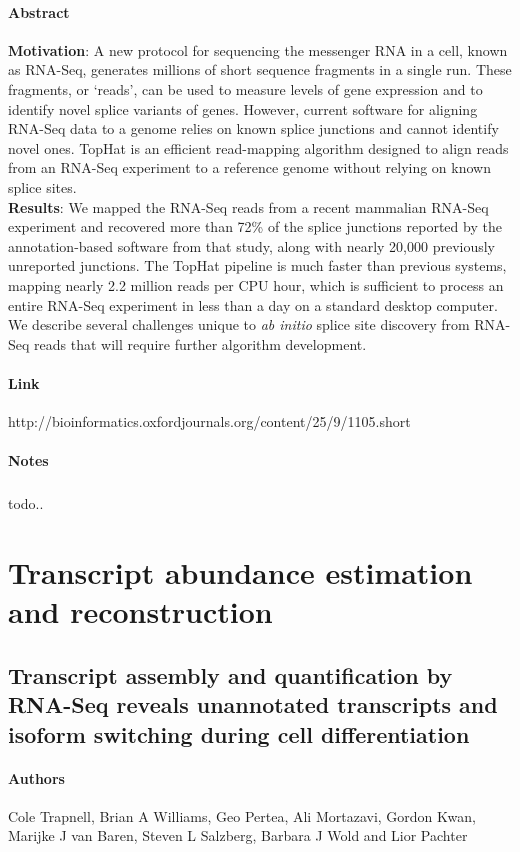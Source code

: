 \documentclass{article}
\begin{document}
			\paragraph{Abstract\\} \textbf{Motivation}: A new protocol for sequencing the messenger RNA in a cell, known as RNA-Seq, generates millions of short sequence fragments in a single run. These fragments, or ‘reads’, can be used to measure levels of gene expression and to identify novel splice variants of genes. However, current software for aligning RNA-Seq data to a genome relies on known splice junctions and cannot identify	novel ones. TopHat is an efficient read-mapping algorithm designed to align reads from an RNA-Seq experiment to a reference genome without relying on known splice sites.\\
			\textbf{Results}: We mapped the RNA-Seq reads from a recent mammalian
			RNA-Seq experiment and recovered more than 72\% of the splice junctions reported by the annotation-based software from that study, along with nearly 20,000 previously unreported junctions. The TopHat pipeline is much faster than previous systems, mapping nearly 2.2 million reads per CPU hour, which is sufficient to process an entire RNA-Seq experiment in less than a day on a standard desktop computer. We describe several challenges unique to \textit{ab initio} splice site discovery from RNA-Seq reads that will require further algorithm development.
			\paragraph{Link\\} http://bioinformatics.oxfordjournals.org/content/25/9/1105.short
			\paragraph{Notes}
				\subparagraph{} todo..
	\section{Transcript abundance estimation and reconstruction}
		\subsection{Transcript assembly and quantification by RNA-Seq reveals unannotated transcripts and isoform switching during cell differentiation}
		\paragraph{Authors\\} Cole Trapnell, Brian A Williams, Geo Pertea, Ali Mortazavi, Gordon Kwan,	Marijke J van Baren, Steven L Salzberg,	Barbara J Wold and Lior Pachter
\end{document}
